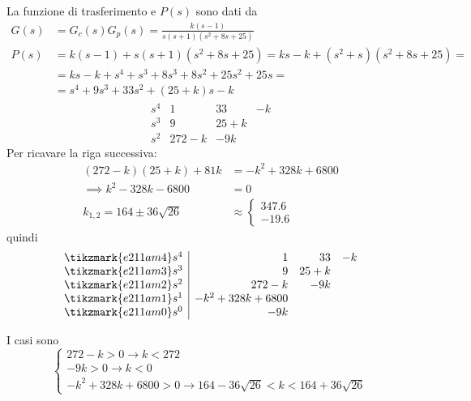 La funzione di trasferimento e \(P(s)\) sono dati da
\begin{align*}
	G(s) &= G_c(s) G_p(s) = \frac{k(s-1)}{s (s+1) (s^2 +8s +25)} \\
	P(s) &= k(s-1) + s (s+1) (s^2 +8s +25) = ks -k +(s^2 +s)(s^2 +8s +25) = \\
	     &= ks -k +s^4 +s^3 +8s^3 +8s^2 +25s^2 +25s = \\
	     &= s^4 +9s^3 +33s^2 +(25+k)s -k
\end{align*}
\[\begin{array}{r|rrr}
	s^4 & 1 & 33 & -k \\
	s^3 & 9 & 25+k \\
	s^2 & 272-k & -9k
\end{array}\]
Per ricavare la riga successiva:
\begin{align*}
	(272-k)(25+k) + 81k &= -k^2 +328k +6800 \\
	\implies k^2 -328k -6800 &= 0\\
	k_{1,2} = 164 \pm 36\sqrt{26} &\approx \begin{cases} 347.6 \\ -19.6 \end{cases}
\end{align*}
quindi
\[\begin{array}{r|rrr}
	\tikzmark{e211am4} s^4 & 1 & 33 & -k 	\\
	\tikzmark{e211am3} s^3 & 9 & 25+k 		\\
	\tikzmark{e211am2} s^2 & 272-k & -9k	\\
	\tikzmark{e211am1} s^1 & -k^2 +328k +6800	\\
	\tikzmark{e211am0} s^0 & -9k
\end{array}\]
I casi sono
\[\begin{cases}
	272-k > 0 \rightarrow k < 272 \\
	-9k > 0 \rightarrow k < 0 \\
	-k^2 +328k +6800 > 0 \rightarrow 164 -36\sqrt{26} < k < 164 +36\sqrt{26}
\end{cases}\]

